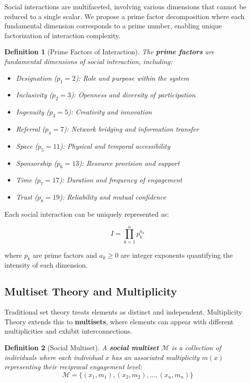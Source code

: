 \documentclass[11pt,a4paper]{article}
\newtheorem{definition}{Definition}
\begin{document}
Social interactions are multifaceted, involving various dimensions that cannot be reduced to a single scalar. We propose a prime factor decomposition where each fundamental dimension corresponds to a prime number, enabling unique factorization of interaction complexity.

\begin{definition}[Prime Factors of Interaction]
The \textbf{prime factors} are fundamental dimensions of social interaction, including:
\begin{itemize}
    \item Designation ($p_1 = 2$): Role and purpose within the system
    \item Inclusivity ($p_2 = 3$): Openness and diversity of participation
    \item Ingenuity ($p_3 = 5$): Creativity and innovation
    \item Referral ($p_4 = 7$): Network bridging and information transfer
    \item Space ($p_5 = 11$): Physical and temporal accessibility
    \item Sponsorship ($p_6 = 13$): Resource provision and support
    \item Time ($p_7 = 17$): Duration and frequency of engagement
    \item Trust ($p_8 = 19$): Reliability and mutual confidence
\end{itemize}
\end{definition}

Each social interaction can be uniquely represented as:

\begin{equation}
I = \prod_{k=1}^{n} p_k^{a_k}
\end{equation}

where $p_k$ are prime factors and $a_k \geq 0$ are integer exponents quantifying the intensity of each dimension.

\subsection{Multiset Theory and Multiplicity}

Traditional set theory treats elements as distinct and independent. Multiplicity Theory extends this to \textbf{multisets}, where elements can appear with different multiplicities and exhibit interconnections.

\begin{definition}[Social Multiset]
A \textbf{social multiset} $\mathcal{M}$ is a collection of individuals where each individual $x$ has an associated multiplicity $m(x)$ representing their reciprocal engagement level:
\begin{equation}
\mathcal{M} = \{(x_1, m_1), (x_2, m_2), \ldots, (x_n, m_n)\}
\end{equation}
\end{definition}
\end{document}
